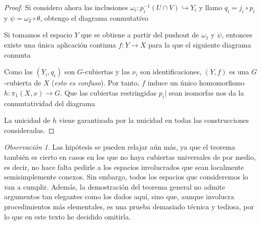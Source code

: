 \documentclass[12pt,a4paper]{book}
\theoremstyle{definition} \newtheorem{defn}[thm]{Definición}
\theoremstyle{definition} \newtheorem{ejemplo}[thm]{Ejemplo}
\theoremstyle{definition} \newtheorem{ejercicio}[thm]{Ejercicio}
\theoremstyle{remark} \newtheorem*{obs}{Observación}
\def\gf{\pi_1}
\begin{document}
\begin{proof}
Si considero ahora las inclusiones $\omega_i:p_i^{-1}(U\cap V) \hookrightarrow Y_i$ y llamo $q_i=j_i\circ p_i$ y $\psi=\omega_2\circ \theta$, obtengo el diagrama conmutativo
 \begin{center}
 \end{center}
   Si tomamos el espacio $Y$ que se obtiene a partir del pushout de $\omega_1$ y $\psi$, entonces existe una única aplicación continua $f:Y\rightarrow X$ para la que el siguiente diagrama conmuta
 \begin{center}
 \end{center}
 Como las $(Y_i,q_i)$ son $G$-cubiertas y las $\nu_i$ son identificaciones, $(Y,f)$ es una $G$-cubierta de $X$ (\textit{esto es confuso}). Por tanto, $f$ induce un único homomorfismo $h:\gf(X,x)\rightarrow G$. Que las cubiertas restringidas $p_i|$ sean isomorfas nos da la conmutatividad del diagrama
 \begin{center}
 \end{center}
 La unicidad de $h$ viene garantizada por la unicidad en todas las construcciones consideradas.
 \end{proof}

 \begin{obs}
   Las hipótesis se pueden relajar aún más, ya que el teorema también es cierto en casos en los que no haya cubiertas universales de por medio, es decir, no hace falta pedirle a los espacios involucrados que sean localmente semisimplemente conexos. Sin embargo, todos los espacios que consideremos lo van a cumplir. Además, la demostración del teorema general no admite argumentos tan elegantes como los dados aquí, sino que, aunque involucra procedimientos más elementales, es una prueba demasiado técnica y tediosa, por lo que en este texto he decidido omitirla.
 \end{obs}
\end{document}
